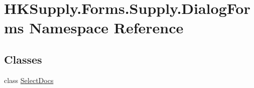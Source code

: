 \hypertarget{namespace_h_k_supply_1_1_forms_1_1_supply_1_1_dialog_forms}{}\section{H\+K\+Supply.\+Forms.\+Supply.\+Dialog\+Forms Namespace Reference}
\label{namespace_h_k_supply_1_1_forms_1_1_supply_1_1_dialog_forms}
\subsection*{Classes}
\begin{DoxyCompactItemize}
\item 
class \mbox{\hyperlink{class_h_k_supply_1_1_forms_1_1_supply_1_1_dialog_forms_1_1_select_docs}{Select\+Docs}}
\end{DoxyCompactItemize}
